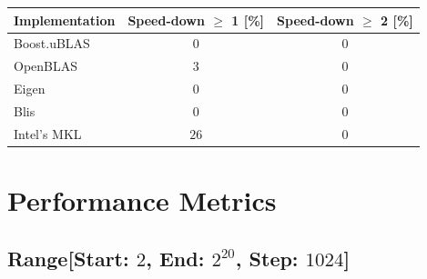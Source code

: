 \begin{table}[ht]
    \begin{tabular}{|l|c|c|}
        \hline
        \textbf{Implementation} & \textbf{Speed-down $\geq$ 1 [\%]} & \textbf{Speed-down $\geq$ 2 [\%]}\\
        \hline
        Boost.uBLAS & $0$ & $0$ \\
        \hline
        OpenBLAS    & $3$ & $0$ \\
        \hline
        Eigen       & $0$ & $0$ \\
        \hline
        Blis        & $0$ & $0$ \\
        \hline
        Intel's MKL & $26$ & $0$ \\
        \hline
    \end{tabular}
\end{table}

\clearpage
\section{Performance Metrics}

\subsection*{Range[Start: $2$, End: $2^{20}$, Step: $1024$]}

